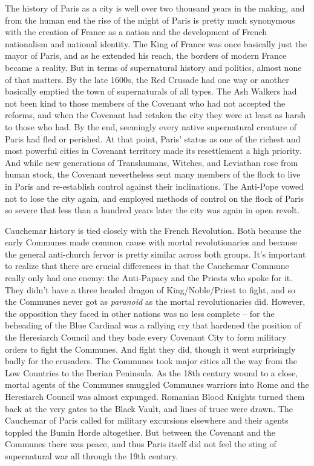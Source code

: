 The history of Paris as a city is well over two thousand years in the making, and from the human end the rise of the might of Paris is pretty much synonymous with the creation of France as a nation and the development of French nationalism and national identity. The King of France was once basically just the mayor of Paris, and as he extended his reach, the borders of modern France became a reality. But in terms of supernatural history and politics, almost none of that matters. By the late 1600s, the Red Crusade had one way or another basically emptied the town of supernaturals of all types. The Ash Walkers had not been kind to those members of the Covenant who had not accepted the reforms, and when the Covenant had retaken the city they were at least as harsh to those who had. By the end, seemingly every native supernatural creature of Paris had fled or perished. At that point, Paris' status as one of the richest and most powerful cities in Covenant territory made its resettlement a high priority. And while new generations of Transhumans, Witches, and Leviathan rose from human stock, the Covenant nevertheless sent many members of the flock to live in Paris and re-establish control against their inclinations. The Anti-Pope vowed not to lose the city again, and employed methods of control on the flock of Paris so severe that less than a hundred years later the city was again in open revolt.

Cauchemar history is tied closely with the French Revolution. Both because the early Communes made common cause with mortal revolutionaries and because the general anti-church fervor is pretty similar across both groups. It's important to realize that there are crucial differences in that the Cauchemar Commune really only had one enemy: the Anti-Papacy and the Priests who spoke for it. They didn't have a three headed dragon of King/Noble/Priest to fight, and so the Communes never got as \textit{paranoid} as the mortal revolutionaries did. However, the opposition they faced in other nations was no less complete -- for the beheading of the Blue Cardinal was a rallying cry that hardened the position of the Heresiarch Council and they bade every Covenant City to form military orders to fight the Communes. And fight they did, though it went surprisingly badly for the crusaders. The Communes took major cities all the way from the Low Countries to the Iberian Peninsula. As the 18th century wound to a close, mortal agents of the Communes smuggled Communes warriors into Rome and the Heresiarch Council was almost expunged. Romanian Blood Knights turned them back at the very gates to the Black Vault, and lines of truce were drawn. The Cauchemar of Paris called for military excursions elsewhere and their agents toppled the Bumin Horde altogether. But between the Covenant and the Communes there was peace, and thus Paris itself did not feel the sting of supernatural war all through the 19th century.

